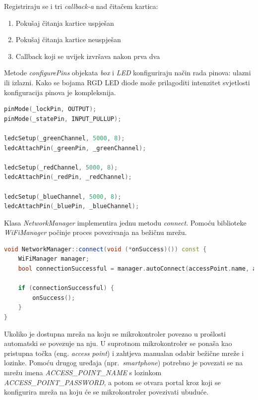 Registriraju se i tri \textit{callback-a} nad čitačem kartica:
\begin{enumerate}
    \item Pokušaj čitanja kartice uspješan
    \item Pokušaj čitanja kartice neuspješan
    \item Callback koji se uvijek izvršava nakon prva dva
\end{enumerate}

Metode \textit{configurePins} objekata \textit{box} i \textit{LED} konfiguriraju način rada pinova: ulazni ili izlazni.
Kako se bojama RGD LED diode može prilagoditi intenzitet svjetlosti konfiguracija pinova je kompleksnija.

\begin{lstlisting}[language=C++]
pinMode(_lockPin, OUTPUT);
pinMode(_statePin, INPUT_PULLUP);

ledcSetup(_greenChannel, 5000, 8);
ledcAttachPin(_greenPin, _greenChannel);

ledcSetup(_redChannel, 5000, 8);
ledcAttachPin(_redPin, _redChannel);

ledcSetup(_blueChannel, 5000, 8);
ledcAttachPin(_bluePin, _blueChannel);
\end{lstlisting}

Klasa \textit{NetworkManager} implementira jednu metodu \textit{connect}.
Pomoću biblioteke \textit{WiFiManager} počinje proces povezivanja na bežičnu mrežu.

\begin{lstlisting}[language=C++]
void NetworkManager::connect(void (*onSuccess)()) const {
    WiFiManager manager;
    bool connectionSuccessful = manager.autoConnect(accessPoint.name, accessPoint.password);

    if (connectionSuccessful) {
        onSuccess();
    }
}
\end{lstlisting}

\clearpage

Ukoliko je dostupna mreža na koju se mikrokontroler povezao u prošlosti automatski se povezuje na nju.
U suprotnom mikrokontroler se ponaša kao pristupna točka (eng. \textit{access point}) i zahtjeva manualan odabir
bežične mreže i lozinke.
Pomoću drugog uređaja (npr.~\textit{smartphone}) potrebno je povezati se na mrežu imena \textit{ACCESS\_POINT\_NAME} s
lozinkom \textit{ACCESS\_POINT\_PASSWORD}, a potom se otvara portal kroz koji se konfigurira mreža na koju će se
mikrokontroler povezivati ubuduće.


